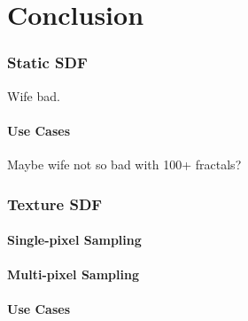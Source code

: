 \chapter{Conclusion}
\label{chapter5}

\subsection{Static SDF}

Wife bad.

\subsubsection{Use Cases}

Maybe wife not so bad with 100+ fractals?

\subsection{Texture SDF}

\subsubsection{Single-pixel Sampling}

\subsubsection {Multi-pixel Sampling}

\subsubsection{Use Cases}